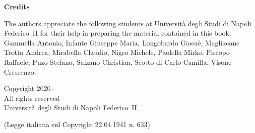 \thispagestyle{empty}
\noindent
{\Large\textbf{Credits}}
\bigskip

\noindent
\begin{minipage}{\textwidth}
The authors appreciate the following students at Università degli Studi di Napoli Federico~II for their help in preparing the material contained in this book:
Gammella Antonio,
Infante Giuseppe Maria,
Longobardo Giosuè,
Magliacane Trotta Andrea,
Mirabella Claudio,
Nigro Michele,
Paolella Mirko,
Piscopo Raffaele,
Puzo Stefano,
Salzano Christian,
Scotto di Carlo Camilla,
Visone Crescenzo.
\end{minipage}
\vspace*{\fill}
{



\bigskip

\centering Copyright 2020--\the\year\ \myAuthorName\\
All rights reserved\\
Università degli Studi di Napoli Federico~II

\medskip
\hfil (Legge italiana sul Copyright 22.04.1941 n. 633)
}%